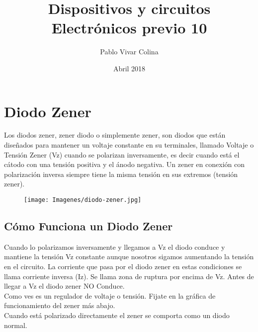 \documentclass{article}
\title{Dispositivos y circuitos Electrónicos previo 10}
\author{Pablo Vivar Colina}
\date{Abril 2018}
\begin{document}
\maketitle









\section{Diodo Zener}

 Los diodos zener, zener diodo o simplemente zener, son diodos que están diseñados para mantener un voltaje constante en su terminales, llamado Voltaje o Tensión Zener (Vz) cuando se polarizan inversamente, es decir cuando está el cátodo con una tensión positiva y el ánodo negativa. Un zener en conexión con polarización inversa siempre tiene la misma tensión en sus extremos (tensión zener).\citep{dZener}\\

\begin{figure}[ht!]
   \centering
\texttt{[image: Imagenes/diodo-zener.jpg]}
\caption{}
     \label{fig:zener}
 \end{figure}
 
 \subsection{Cómo Funciona un Diodo Zener}

 Cuando lo polarizamos inversamente y llegamos a Vz el diodo conduce y mantiene la tensión Vz constante aunque nosotros sigamos aumentando la tensión en el circuito. La corriente que pasa por el diodo zener en estas condiciones se llama corriente inversa (Iz).
 Se llama zona de ruptura por encima de Vz. Antes de llegar a Vz el diodo zener NO Conduce.\citep{dZener}\\

 Como ves es un regulador de voltaje o tensión. Fijate en la gráfica de funcionamiento del zener más abajo.\citep{dZener}\\

 Cuando está polarizado directamente el zener se comporta como un diodo normal.\citep{dZener}\\
\end{document}
